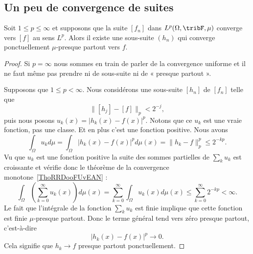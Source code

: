 \subsection{Un peu de convergence de suites}

\begin{proposition}  \label{PropWoywYG}
	Soit \( 1\leq p\leq \infty\) et supposons que la suite \( [f_n]\) dans \( L^p(\Omega,\tribF,\mu)\) converge vers \( [f]\) au sens \( L^p\). Alors il existe une sous-suite \( (h_n)\) qui converge ponctuellement \( \mu\)-presque partout vers \( f\).
\end{proposition}

\begin{proof}
	Si \( p=\infty\) nous sommes en train de parler de la convergence uniforme et il ne faut même pas prendre ni de sous-suite ni de « presque partout ».

	Supposons que \( 1\leq p<\infty\). Nous considérons une sous-suite \( [h_n]\) de \( [f_n]\) telle que
	\begin{equation}
		\| [h_j]-[f] \|_p<2^{-j},
	\end{equation}
	puis nous posons \( u_k(x)=| h_k(x)-f(x) |^p\). Notons que ce \( u_k\) est une vraie fonction, pas une classe. Et en plus c'est une fonction positive. Nous avons
	\begin{equation}
		\int_{\Omega}u_kd\mu=\int_{\Omega}| h_k(x)-f(x) |^pd\mu(x)=\| h_k-f \|_p^p\leq 2^{-kp}.
	\end{equation}
	Vu que \( u_k\) est une fonction positive la suite des sommes partielles de \( \sum_ku_k\) est croissante et vérifie donc le théorème de la convergence monotone~\ref{ThoRRDooFUvEAN} :
	\begin{equation}
		\int_{\Omega}\left( \sum_{k=0}^{\infty}u_k(x) \right)d\mu(x)=\sum_{k=0}^{\infty}\int_{\Omega}u_k(x)d\mu(x)
		\leq\sum_{k=0}^{\infty}2^{-kp}<\infty.
	\end{equation}
	Le fait que l'intégrale de la fonction \( \sum_ku_k\) est finie implique que cette fonction est finie \( \mu\)-presque partout. Donc le terme général tend vers zéro presque partout, c'est-à-dire
	\begin{equation}
		| h_k(x)-f(x) |^p\to 0.
	\end{equation}
	Cela signifie que \( h_k\to f\) presque partout ponctuellement.
\end{proof}

